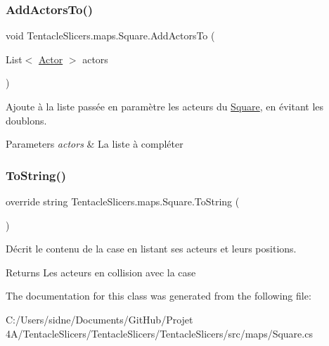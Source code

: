 \subsubsection{\texorpdfstring{Add\+Actors\+To()}{AddActorsTo()}}
{\footnotesize\ttfamily void Tentacle\+Slicers.\+maps.\+Square.\+Add\+Actors\+To (\begin{DoxyParamCaption}\item[{List$<$ \hyperlink{class_tentacle_slicers_1_1actors_1_1_actor}{Actor} $>$}]{actors }\end{DoxyParamCaption})}



Ajoute à la liste passée en paramètre les acteurs du \hyperlink{class_tentacle_slicers_1_1maps_1_1_square}{Square}, en évitant les doublons. 


\begin{DoxyParams}{Parameters}
{\em actors} & La liste à compléter \\
\hline
\end{DoxyParams}
\mbox{\label{class_tentacle_slicers_1_1maps_1_1_square_af8509f3f78a9c48d7037ba3fddecc741}} 
\subsubsection{\texorpdfstring{To\+String()}{ToString()}}
{\footnotesize\ttfamily override string Tentacle\+Slicers.\+maps.\+Square.\+To\+String (\begin{DoxyParamCaption}{ }\end{DoxyParamCaption})}



Décrit le contenu de la case en listant ses acteurs et leurs positions. 

\begin{DoxyReturn}{Returns}
Les acteurs en collision avec la case 
\end{DoxyReturn}


The documentation for this class was generated from the following file\+:\begin{DoxyCompactItemize}
\item 
C\+:/\+Users/sidne/\+Documents/\+Git\+Hub/\+Projet 4\+A/\+Tentacle\+Slicers/\+Tentacle\+Slicers/\+Tentacle\+Slicers/src/maps/Square.\+cs\end{DoxyCompactItemize}
